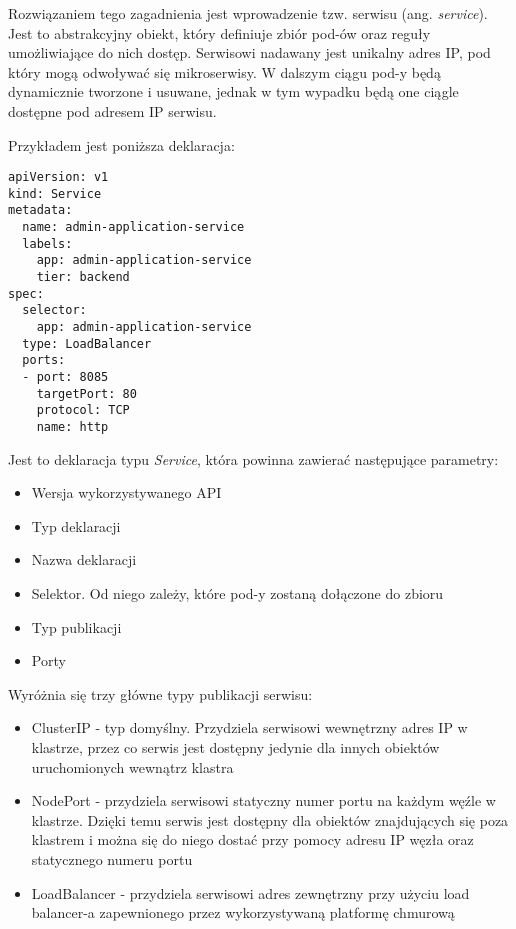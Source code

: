 Rozwiązaniem tego zagadnienia jest wprowadzenie tzw. serwisu (ang. \textit{service}). Jest to abstrakcyjny 
obiekt, który definiuje zbiór pod-ów oraz reguły umożliwiające do nich dostęp. 
Serwisowi nadawany jest unikalny adres IP, pod który mogą odwoływać się mikroserwisy. 
W dalszym ciągu pod-y będą dynamicznie tworzone i usuwane, jednak w tym wypadku będą 
one ciągle dostępne pod adresem IP serwisu.

Przykładem jest poniższa deklaracja:

\begin{lstlisting}
apiVersion: v1
kind: Service
metadata:
  name: admin-application-service
  labels:
    app: admin-application-service
    tier: backend
spec:
  selector:
    app: admin-application-service
  type: LoadBalancer
  ports:
  - port: 8085
    targetPort: 80
    protocol: TCP
    name: http 
\end{lstlisting}

Jest to deklaracja typu \textit{Service}, która powinna zawierać następujące parametry:

\begin{itemize} %
    \item Wersja wykorzystywanego API
    \item Typ deklaracji
    \item Nazwa deklaracji
    \item Selektor. Od niego zależy, które pod-y zostaną dołączone do zbioru
    \item Typ publikacji
    \item Porty
\end{itemize}

Wyróżnia się trzy główne typy publikacji serwisu:

\begin{itemize} %
    \item ClusterIP - typ domyślny. Przydziela serwisowi wewnętrzny adres IP 
    w klastrze, przez co serwis jest dostępny jedynie dla innych obiektów uruchomionych 
    wewnątrz klastra
    \item NodePort - przydziela serwisowi statyczny numer portu na każdym węźle 
    w klastrze. Dzięki temu serwis jest dostępny dla obiektów znajdujących się poza 
    klastrem i można się do niego dostać przy pomocy adresu IP węzła oraz statycznego 
    numeru portu
    \item LoadBalancer - przydziela serwisowi adres zewnętrzny przy użyciu load 
    balancer-a zapewnionego przez wykorzystywaną platformę chmurową
\end{itemize}

